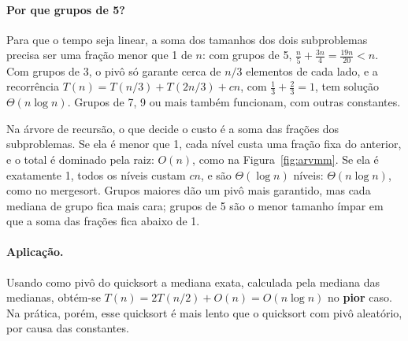 \begin{figura}[Árvore de recursão de $T(n)=T(n/5)+T(3n/4)+cn$. Os dois subproblemas somam $\frac{19}{20}$ do tamanho do pai, e o custo de cada nível é $\frac{19}{20}$ do custo do nível acima: a soma é uma série geométrica, limitada por $20cn$.\label{fig:arvmm}]
\end{figura}

\paragraph{Por que grupos de 5?} Para que o tempo seja linear, a soma dos tamanhos dos dois subproblemas precisa ser uma fração menor que 1 de $n$: com grupos de 5, $\frac n5+\frac{3n}4=\frac{19n}{20}<n$. Com grupos de 3, o pivô só garante cerca de $n/3$ elementos de cada lado, e a recorrência $T(n)=T(n/3)+T(2n/3)+cn$, com $\frac13+\frac23=1$, tem solução $\Theta(n\log n)$. Grupos de 7, 9 ou mais também funcionam, com outras constantes.

\begin{intuicao}
Na árvore de recursão, o que decide o custo é a soma das frações dos subproblemas. Se ela é menor que 1, cada nível custa uma fração fixa do anterior, e o total é dominado pela raiz: $O(n)$, como na Figura~\ref{fig:arvmm}. Se ela é exatamente 1, todos os níveis custam $cn$, e são $\Theta(\log n)$ níveis: $\Theta(n\log n)$, como no mergesort. Grupos maiores dão um pivô mais garantido, mas cada mediana de grupo fica mais cara; grupos de 5 são o menor tamanho ímpar em que a soma das frações fica abaixo de 1.
\end{intuicao}

\paragraph{Aplicação.} Usando como pivô do quicksort a mediana exata, calculada pela mediana das medianas, obtém-se $T(n)=2T(n/2)+O(n)=O(n\log n)$ no \textbf{pior} caso. Na prática, porém, esse quicksort é mais lento que o quicksort com pivô aleatório, por causa das constantes.

